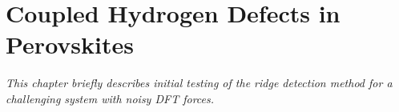 \chapter{Coupled Hydrogen Defects in Perovskites}
\label{chap:perovskites}

\textit{This chapter briefly describes initial testing of the ridge detection method for a challenging system with noisy DFT forces.}




